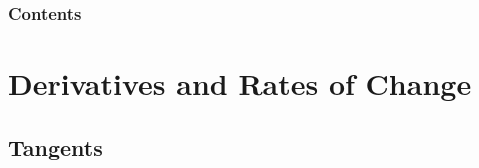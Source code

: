 \documentclass[serif,ignorenonframetext]{beamer}
\title{\commonTitleZeroTwoOne}
\subtitle{\commonSubtitleZeroTwoOne}
\author{\commonAuthor}
\institute{\commonInstitute}
\date{\commonDateZeroTwoOne}
\begin{document}

\begin{frame}
  \titlepage
\end{frame}

\begin{frame}
  \frametitle{Contents}
  \tableofcontents
\end{frame}

\section{Derivatives and Rates of Change}

\subsection{Tangents}
\end{document}
